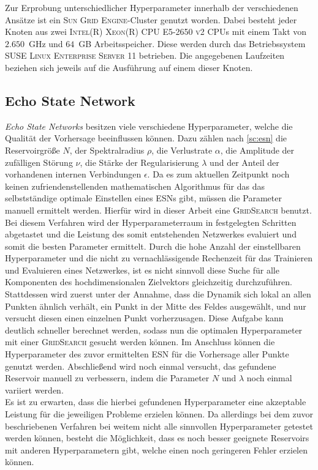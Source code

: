 Zur Erprobung unterschiedlicher Hyperparameter innerhalb der verschiedenen Ansätze ist ein \textsc{Sun Grid Engine}-Cluster genutzt worden. Dabei besteht jeder Knoten aus zwei \textsc{Intel(R) Xeon(R) CPU E5-2650 v2} CPUs mit einem Takt von $2.650$~GHz und $64$~GB Arbeitsspeicher. Diese werden durch das Betriebssystem \textsc{SUSE Linux Enterprise Server 11} betrieben. Die angegebenen Laufzeiten beziehen sich jeweils auf die Ausführung auf einem dieser Knoten. 


\FloatBarrier
\subsection{Echo State Network}
\label{sec:exp_general_esn}
\textit{Echo State Networks} besitzen viele verschiedene Hyperparameter, welche die Qualität der Vorhersage beeinflussen können. Dazu zählen nach \ref{sc:esn} die Reservoirgröße $N$, der Spektralradius $\rho$, die Verlustrate $\alpha$, die Amplitude der zufälligen Störung $\nu$, die Stärke der Regularisierung $\lambda$ und der Anteil der vorhandenen internen Verbindungen $\epsilon$. Da es zum aktuellen Zeitpunkt noch keinen zufriendenstellenden mathematischen Algorithmus für das das selbstständige optimale Einstellen eines \textsc{ESN}s gibt, müssen die Parameter manuell ermittelt werden. Hierfür wird in dieser Arbeit eine \textsc{GridSearch} benutzt. Bei diesem Verfahren wird der Hyperparameterraum in festgelegten Schritten abgetastet und die Leistung des somit entstehenden Netzwerkes evaluiert und somit die besten Parameter ermittelt. Durch die hohe Anzahl der einstellbaren Hyperparameter und die nicht zu vernachlässigende Rechenzeit für das Trainieren und Evaluieren eines Netzwerkes, ist es nicht sinnvoll diese Suche für alle Komponenten des hochdimensionalen Zielvektors gleichzeitig durchzuführen. Stattdessen wird zuerst unter der Annahme, dass die Dynamik sich lokal an allen Punkten ähnlich verhält, ein Punkt in der Mitte des Feldes ausgewählt, und nur versucht diesen einen einzelnen Punkt vorherzusagen. Diese Aufgabe kann deutlich schneller berechnet werden, sodass nun die optimalen Hyperparameter mit einer \textsc{GridSearch} gesucht werden können. Im Anschluss können die Hyperparameter des  zuvor ermittelten \textsc{ESN} für die Vorhersage aller Punkte genutzt werden. Abschließend wird noch einmal versucht, das gefundene Reservoir manuell zu verbessern, indem die Parameter $N$ und $\lambda$ noch einmal variiert werden.\\
Es ist zu erwarten, dass die hierbei gefundenen Hyperparameter eine akzeptable Leistung für die jeweiligen Probleme erzielen können. Da allerdings bei dem zuvor beschriebenen Verfahren bei weitem nicht alle sinnvollen Hyperparameter getestet werden können, besteht die Möglichkeit, dass es noch besser geeignete Reservoirs mit anderen Hyperparametern gibt, welche einen noch geringeren Fehler erzielen können.\\

